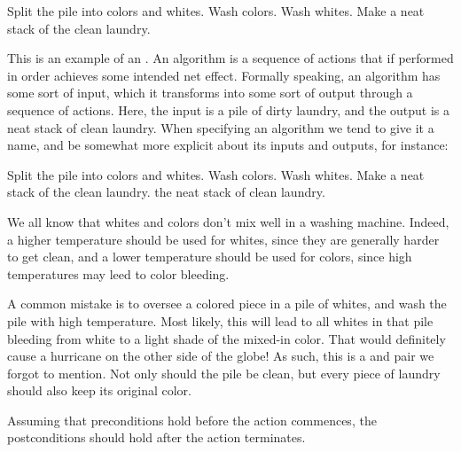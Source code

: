 \begin{codebox}
\li Split the pile into colors and whites.
\li Wash colors.
\li Wash whites.
\li Make a neat stack of the clean laundry.
\end{codebox}

This is an example of an . An algorithm is a sequence of actions
that if performed in order achieves some intended net effect. Formally
speaking, an algorithm has some sort of input, which it transforms into some
sort of output through a sequence of actions. Here, the input is a pile of
dirty laundry, and the output is a neat stack of clean laundry. When specifying
an algorithm we tend to give it a name, and be somewhat more explicit about its
inputs and outputs, for instance:

\begin{codebox}
\li Split the pile into colors and whites.
\li Wash colors.
\li Wash whites.
\li Make a neat stack of the clean laundry.
\li \Return the neat stack of clean laundry.
\end{codebox}

We all know that whites and colors don't mix well in a washing machine. Indeed,
a higher temperature should be used for whites, since they are generally harder
to get clean, and a lower temperature should be used for colors, since high
temperatures may leed to color bleeding.

A common mistake is to oversee a colored piece in a pile of whites, and wash
the pile with high temperature.  Most likely, this will lead to all whites in
that pile bleeding from white to a light shade of the mixed-in color. That
would definitely cause a hurricane on the other side of the globe!  As such,
this is a  and  pair we forgot to mention. Not
only should the pile be clean, but every piece of laundry should also keep its
original color.

\begin{definition}

Assuming that preconditions hold before the action commences, the
postconditions should hold after the action terminates\footnotemark.


\end{definition}

